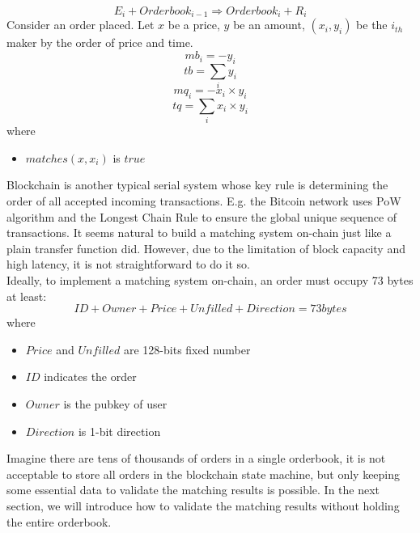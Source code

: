 \documentclass[a4paper,12pt]{article}
\begin{document}
\begin{equation*}
    E_{i} + Orderbook_{i-1} \Rightarrow Orderbook_{i} + R_{i}
\end{equation*}
Consider an order placed. Let \(x\) be a price, \(y\) be an amount,  \((x_{i}, y_{i})\) be the \(i_{th}\) maker by the order of price and time.\\
\begin{equation*}
    mb_{i}=-y_{i}
\end{equation*}
\begin{equation*}
    tb=\sum\limits_{i} y_{i}
\end{equation*}
\begin{equation*}
    mq_{i}=-x_{i} \times y_{i}
\end{equation*}
\begin{equation*}
    tq=\sum\limits_{i} x_{i} \times y_{i}
\end{equation*}
where\\
\begin{itemize}
    \item $matches(x, x_{i})$ is $true$
\end{itemize}
Blockchain is another typical serial system whose key rule is determining the order of all accepted incoming transactions. E.g. the Bitcoin network uses PoW algorithm and the Longest Chain Rule to ensure the global unique sequence of transactions. It seems natural to build a matching system on-chain just like a plain transfer function did. However, due to the limitation of block capacity and high latency, it is not straightforward to do it so.\\
Ideally, to implement a matching system on-chain, an order must occupy 73 bytes at least:\\
\begin{equation*}
ID + Owner + Price + Unfilled + Direction = 73 bytes
\end{equation*}
where\\
\begin{itemize}
    \item $Price$ and $Unfilled$ are 128-bits fixed number
    \item $ID$ indicates the order
    \item $Owner$ is the pubkey of user
    \item $Direction$ is 1-bit direction
\end{itemize}
Imagine there are tens of thousands of orders in a single orderbook, it is not acceptable to store all orders in the blockchain state machine, but only keeping some essential data to validate the matching results is possible. In the next section, we will introduce how to validate the matching results without holding the entire orderbook.\\
\end{document}
